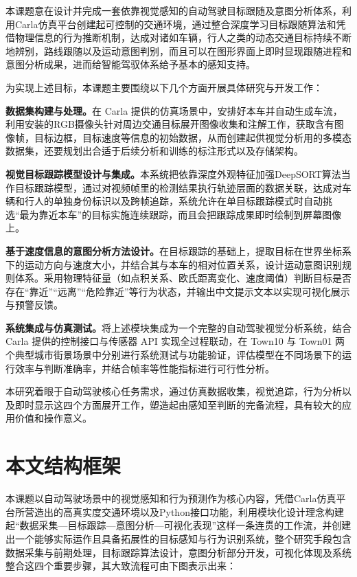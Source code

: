 本课题意在设计并完成一套依靠视觉感知的自动驾驶目标跟随及意图分析体系，利用Carla仿真平台创建起可控制的交通环境，通过整合深度学习目标跟随算法和凭借物理信息的行为推断机制，达成对诸如车辆，行人之类的动态交通目标持续不断地辨别，路线跟随以及运动意图判别，而且可以在图形界面上即时显现跟随进程和意图分析成果，进而给智能驾驭体系给予基本的感知支持。

为实现上述目标，本课题主要围绕以下几个方面开展具体研究与开发工作：

\textbf{数据集构建与处理。}在 Carla 提供的仿真场景中，安排好本车并自动生成车流，利用安装的RGB摄像头针对周边交通目标展开图像收集和注解工作，获取含有图像帧，目标边框，目标速度等信息的初始数据，从而创建起供视觉分析用的多模态数据集，还要规划出合适于后续分析和训练的标注形式以及存储架构。

\textbf{视觉目标跟踪模型设计与集成。}本系统把依靠深度外观特征加强DeepSORT算法当作目标跟踪模型，通过对视频帧里的检测结果执行轨迹层面的数据关联，达成对车辆和行人的单独身份标识以及跨帧追踪，系统允许在单目标跟踪模式时自动挑选“最为靠近本车”的目标实施连续跟踪，而且会把跟踪成果即时绘制到屏幕图像上。

\textbf{基于速度信息的意图分析方法设计。}在目标跟踪的基础上，提取目标在世界坐标系下的运动方向与速度大小，并结合其与本车的相对位置关系，设计运动意图识别规则体系。采用物理特征量（如点积关系、欧氏距离变化、速度阈值）判断目标是否存在“靠近”“远离”“危险靠近”等行为状态，并输出中文提示文本以实现可视化展示与预警反馈。

\textbf{系统集成与仿真测试。}将上述模块集成为一个完整的自动驾驶视觉分析系统，结合 Carla 提供的控制接口与传感器 API 实现全过程联动，在 Town10 与 Town01 两个典型城市街景场景中分别进行系统测试与功能验证，评估模型在不同场景下的运行效率与判断准确率，并结合帧率等性能指标进行可行性分析。

本研究着眼于自动驾驶核心任务需求，通过仿真数据收集，视觉追踪，行为分析以及即时显示这四个方面展开工作，塑造起由感知至判断的完备流程，具有较大的应用价值和操作意义。

\section{本文结构框架}

本课题以自动驾驶场景中的视觉感知和行为预测作为核心内容，凭借Carla仿真平台所营造出的高真实度交通环境以及Python接口功能，利用模块化设计理念构建起“数据采集—目标跟踪—意图分析—可视化表现”这样一条连贯的工作流，并创建出一个能够实际运作且具备拓展性的目标感知与行为识别系统，整个研究手段包含数据采集与前期处理，目标跟踪算法设计，意图分析部分开发，可视化体现及系统整合这四个重要步骤，其大致流程可由下图表示出来：

